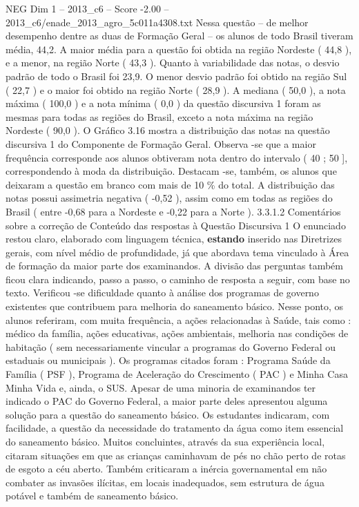 \begin{textsample}{NEG Dim 1 – 2013\_c6 – Score -2.00 – 2013\_c6/enade\_2013\_agro\_5c011a4308.txt}
Nessa questão – de melhor desempenho dentre as duas de Formação Geral – os alunos de todo Brasil tiveram média, 44,2.
A maior média para a questão foi obtida na região Nordeste ( 44,8 ), e a menor, na região Norte ( 43,3 ).
Quanto à variabilidade das notas, o desvio padrão de todo o Brasil foi 23,9.
O menor desvio padrão foi obtido na região Sul ( 22,7 ) e o maior foi obtido na região Norte ( 28,9 ).
A mediana ( 50,0 ), a nota máxima ( 100,0 ) e a nota mínima ( 0,0 ) da questão discursiva 1 foram as mesmas para todas as regiões do Brasil, exceto a nota máxima na região Nordeste ( 90,0 ).
O Gráfico 3.16 mostra a distribuição das notas na questão discursiva 1 do Componente de Formação Geral.
Observa -se que a maior frequência corresponde aos alunos obtiveram nota dentro do intervalo ( 40 ; 50 ], correspondendo à moda da distribuição.
Destacam -se, também, os alunos que deixaram a questão em branco com mais de 10 \% do total.
A distribuição das notas possui assimetria negativa ( -0,52 ), assim como em todas as regiões do Brasil ( entre -0,68 para a Nordeste e -0,22 para a Norte ). 3.3.1.2 Comentários sobre a correção de Conteúdo das respostas à Questão Discursiva 1 O enunciado restou claro, elaborado com linguagem técnica, \textbf{estando} inserido nas Diretrizes gerais, com nível médio de profundidade, já que abordava tema vinculado à Área de formação da maior parte dos examinandos.
A divisão das perguntas também ficou clara indicando, passo a passo, o caminho de resposta a seguir, com base no texto.
Verificou -se dificuldade quanto à análise dos programas de governo existentes que contribuem para melhoria do saneamento básico.
Nesse ponto, os alunos referiram, com muita frequência, a ações relacionadas à Saúde, tais como : médico da família, ações educativas, ações ambientais, melhoria nas condições de habitação ( sem necessariamente vincular a programas do Governo Federal ou estaduais ou municipais ).
Os programas citados foram : Programa Saúde da Família ( PSF ), Programa de Aceleração do Crescimento ( PAC ) e Minha Casa Minha Vida e, ainda, o SUS.
Apesar de uma minoria de examinandos ter indicado o PAC do Governo Federal, a maior parte deles apresentou alguma solução para a questão do saneamento básico.
Os estudantes indicaram, com facilidade, a questão da necessidade do tratamento da água como item essencial do saneamento básico.
Muitos concluintes, através da sua experiência local, citaram situações em que as crianças caminhavam de pés no chão perto de rotas de esgoto a céu aberto.
Também criticaram a inércia governamental em não combater as invasões ilícitas, em locais inadequados, sem estrutura de água potável e também de saneamento básico.

\end{textsample}
